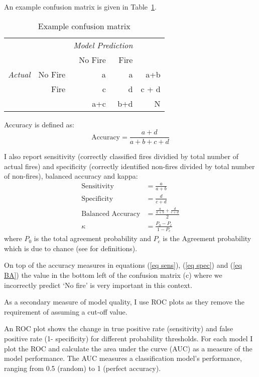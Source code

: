 \documentclass[11pt,a4paper]{article}
\begin{document}
An example confusion matrix is given in Table~\ref{table:ex}. 
\begin{table}[!ht]
	\centering
	\begin{tabular}{lr|rr|r|}
    & 	\multicolumn{1}{l}{} & \multicolumn{2}{c}{\emph{Model Prediction}} \\
    & 	\multicolumn{1}{l}{} & \multicolumn{1}{r}{No Fire} & \multicolumn{1}{r}{Fire} \\
		\cline{3-5}
\emph{Actual} & No Fire & a   & a   & a+b \\
                 & 		Fire & c   & d   & c + d \\
		\cline{3-5}
                 & 		     & a+c & b+d & N \\
		\cline{3-5}
	\end{tabular}
	\caption{Example confusion matrix}
	\label{table:ex}
\end{table}

Accuracy is defined as:
\begin{equation}
\label{eq acc}
\mbox{Accuracy} = \frac{a + d}{a+b+c+d}
\end{equation}

I also report sensitivity (correctly classified fires dividied by total number of actual fires) and specificity (correctly identified non-fires divided by total number of non-fires), balanced accuracy and kappa:
\begin{align}
\label{eq sens}
\mbox{Sensitivity} &= \frac{a }{a+b} \\
\label{eq spec}
\mbox{Specificity} &= \frac{d}{c+d} \\
\label{eq BA}
\mbox{Balanced Accuracy} &= \frac{\frac{a }{a+b} + \frac{d}{c+d} }{2} \\
\label{eq:K}
\kappa &= \frac{P_0 - P_c}{1-P_c}
\end{align}
where $P_0$ is the total agreement probability and $P_c$ is the Agreement probability which is due to chance (see \cite{kappa} for definitions).

On top of the accuracy measures in equations (\ref{eq sens}), (\ref{eq spec}) and (\ref{eq BA}) the value in the bottom left of the confusion matrix (c) where we incorrectly predict `No fire' is very important in this context. 

As a secondary measure of model quality, I use ROC plots as they remove the requirement of assuming a cut-off value. 

An ROC plot shows the change in true positive rate (sensitivity) and false positive rate (1- specificity) for different probability thresholds. For each model I plot the ROC and calculate the area under the curve (AUC) as a measure of the model performance. The AUC measures a classification model's performance, ranging from 0.5 (random) to 1 (perfect accuracy). 
\end{document}
